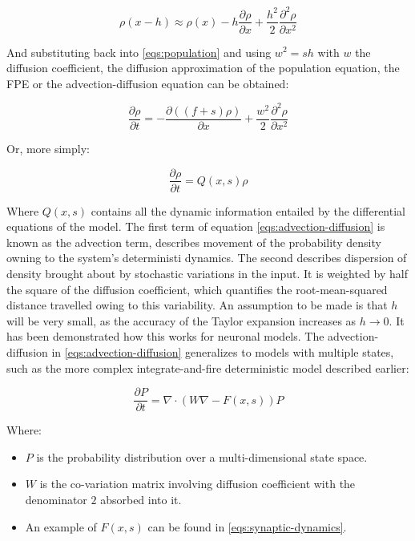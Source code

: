 		\begin{equation}
			\rho(x-h)\approx \rho(x) - h\frac{\partial\rho}{\partial x}+\frac{h^2}{2}\frac{\partial^2\rho}{\partial x^2}
		\end{equation}

		And substituting back into \ref{eqs:population} and using $w^2 = sh$ with $w$ the diffusion coefficient, the diffusion approximation of the population equation, the FPE or the advection-diffusion equation can be obtained:

		\begin{equation}
			\frac{\partial\rho}{\partial t} = -\frac{\partial((f+s)\rho)}{\partial x} +\frac{w^2}{2}\frac{\partial^2\rho}{\partial x^2}
			\label{eqs:advection-diffusion}
		\end{equation}

		Or, more simply:

		\begin{equation}
			\frac{\partial\rho}{\partial t} = Q(x, s)\rho
		\end{equation}

		Where $Q(x,s)$ contains all the dynamic information entailed by the differential equations of the model.
		The first term of equation \ref{eqs:advection-diffusion} is known as the advection term, describes movement of the probability density owning to the system's deterministi dynamics.
		The second describes dispersion of density brought about by stochastic variations in the input.
		It is weighted by half the square of the diffusion coefficient, which quantifies the root-mean-squared distance travelled owing to this variability.
		An assumption to be made is that $h$ will be very small, as the accuracy of the Taylor expansion increases as $h\rightarrow 0$.
		It has been demonstrated how this works for neuronal models.
		The advection-diffusion in \ref{eqs:advection-diffusion} generalizes to models with multiple states, such as the more complex integrate-and-fire deterministic model described earlier:

		\begin{equation}
			\frac{\partial P}{\partial t} = \nabla\cdot(W\nabla - F(x,s))P
		\end{equation}

		Where:

		\begin{itemize}
			\item $P$ is the probability distribution over a multi-dimensional state space.
			\item $W$ is the co-variation matrix involving diffusion coefficient with the denominator $2$ absorbed into it.
			\item An example of $F(x,s)$ can be found in \ref{eqs:synaptic-dynamics}.
		\end{itemize}

